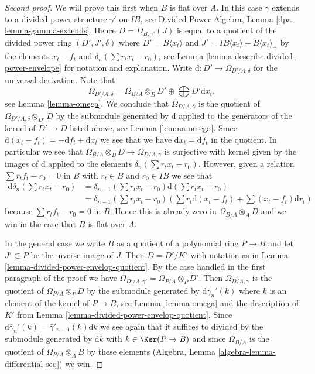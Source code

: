 \begin{proof}[Second proof]
We will prove this first when $B$ is flat over $A$. In this case $\gamma$
extends to a divided power structure $\gamma'$ on $IB$, see
Divided Power Algebra, Lemma \ref{dpa-lemma-gamma-extends}.
Hence $D = D_{B, \gamma'}(J)$ is equal to a quotient of
the divided power ring $(D', J', \delta)$ where $D' =  B\langle x_t \rangle$
and $J' = IB\langle x_t \rangle + B\langle x_t \rangle_{+}$
by the elements $x_t - f_t$ and $\delta_n(\sum r_t x_t - r_0)$, see
Lemma \ref{lemma-describe-divided-power-envelope} for notation
and explanation. Write $\text{d} : D' \to \Omega_{D'/A, \delta}$
for the universal derivation. Note that
$$
\Omega_{D'/A, \delta} =
\Omega_{B/A} \otimes_B D' \oplus \bigoplus D' \text{d}x_t,
$$
see Lemma \ref{lemma-omega}. We conclude that $\Omega_{D/A, \bar\gamma}$
is the quotient of $\Omega_{D'/A, \delta} \otimes_{D'} D$ by the submodule
generated by $\text{d}$ applied to the generators of the
kernel of $D' \to D$ listed above, see Lemma \ref{lemma-omega}.
Since $\text{d}(x_t - f_t) = - \text{d}f_t + \text{d}x_t$
we see that we have $\text{d}x_t = \text{d}f_t$ in the quotient.
In particular we see that $\Omega_{B/A} \otimes_B D \to \Omega_{D/A, \gamma}$
is surjective with kernel given by the images of $\text{d}$
applied to the elements $\delta_n(\sum r_t x_t - r_0)$.
However, given a relation $\sum r_tf_t - r_0 = 0$ in $B$ with
$r_t \in B$ and $r_0 \in IB$ we see that
\begin{align*}
\text{d}\delta_n(\sum r_t x_t - r_0)
& =
\delta_{n - 1}(\sum r_t x_t - r_0)\text{d}(\sum r_t x_t - r_0)
\\
& =
\delta_{n - 1}(\sum r_t x_t - r_0)
\left(
\sum r_t\text{d}(x_t - f_t) + \sum (x_t - f_t)\text{d}r_t
\right)
\end{align*}
because $\sum r_tf_t - r_0 = 0$ in $B$. Hence this is already zero in
$\Omega_{B/A} \otimes_A D$ and we win in the case that $B$ is flat over $A$.

\medskip\noindent
In the general case we write $B$ as a quotient of a polynomial ring
$P \to B$ and let $J' \subset P$ be the inverse image of $J$. Then
$D = D'/K'$ with notation as in
Lemma \ref{lemma-divided-power-envelop-quotient}.
By the case handled in the first paragraph of the proof we have
$\Omega_{D'/A, \bar\gamma'} = \Omega_{P/A} \otimes_P D'$. Then
$\Omega_{D/A, \bar \gamma}$ is the quotient of $\Omega_{P/A} \otimes_P D$
by the submodule generated by $\text{d}\bar\gamma_n'(k)$ where $k$
is an element of the kernel of $P \to B$, see
Lemma \ref{lemma-omega} and the description of $K'$ from
Lemma \ref{lemma-divided-power-envelop-quotient}. Since
$\text{d}\bar\gamma_n'(k) = \bar\gamma'_{n - 1}(k)\text{d}k$ we see
again that it suffices to divided by the submodule generated by
$\text{d}k$ with $k \in \Ker(P \to B)$ and since $\Omega_{B/A}$
is the quotient of $\Omega_{P/A} \otimes_A B$ by these elements
(Algebra, Lemma \ref{algebra-lemma-differential-seq}) we win.
\end{proof}

